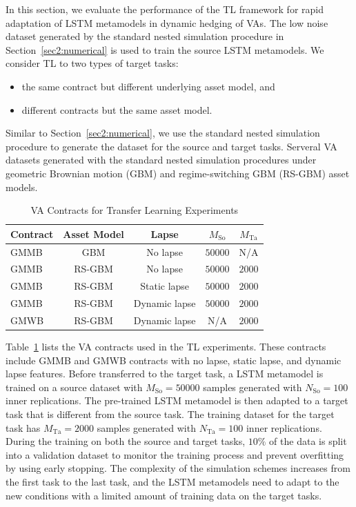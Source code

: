 In this section, we evaluate the performance of the TL framework for rapid adaptation of LSTM metamodels in dynamic hedging of VAs.
The low noise dataset generated by the standard nested simulation procedure in Section~\ref{sec2:numerical} is used to train the source LSTM metamodels.
We consider TL to two types of target tasks: 
\begin{itemize}
    \item the same contract but different underlying asset model, and
    \item different contracts but the same asset model.
\end{itemize}  
Similar to Section~\ref{sec2:numerical}, we use the standard nested simulation procedure to generate the dataset for the source and target tasks.
Serveral VA datasets generated with the standard nested simulation procedures under geometric Brownian motion (GBM) and regime-switching GBM (RS-GBM) asset models.

\begin{table}[ht!] 
    \centering
    \begin{tabular}{lcccc} 
    \toprule
    \textbf{Contract} & \textbf{Asset Model} & \textbf{Lapse} & \textbf{$M_{\text{So}}$}  & \textbf{$M_{\text{Ta}}$}\\
    \midrule
    GMMB & GBM & No lapse & $\num{50000}$ & N/A \\
    GMMB & RS-GBM & No lapse & $\num{50000}$ & $\num{2000}$ \\
    GMMB & RS-GBM & Static lapse & $\num{50000}$ & $\num{2000}$ \\
    GMMB & RS-GBM & Dynamic lapse & $\num{50000}$ & $\num{2000}$ \\
    GMWB & RS-GBM & Dynamic lapse & N/A & $\num{2000}$ \\
    \bottomrule
    \end{tabular}
    \caption{VA Contracts for Transfer Learning Experiments}
    \label{tab3:contracts}
\end{table}

Table~\ref{tab3:contracts} lists the VA contracts used in the TL experiments.
These contracts include GMMB and GMWB contracts with no lapse, static lapse, and dynamic lapse features.
Before transferred to the target task, a LSTM metamodel is trained on a source dataset with $M_{\text{So}} = \num{50000}$ samples generated with $N_{\text{So}} = \num{100}$ inner replications\footnotemark.
The pre-trained LSTM metamodel is then adapted to a target task that is different from the source task.
The training dataset for the target task has $M_{\text{Ta}} = \num{2000}$ samples generated with $N_{\text{Ta}} = \num{100}$ inner replications.
During the training on both the source and target tasks, $10\%$ of the data is split into a validation dataset to monitor the training process and prevent overfitting by using early stopping.
The complexity of the simulation schemes increases from the first task to the last task, and the LSTM metamodels need to adapt to the new conditions with a limited amount of training data on the target tasks.

